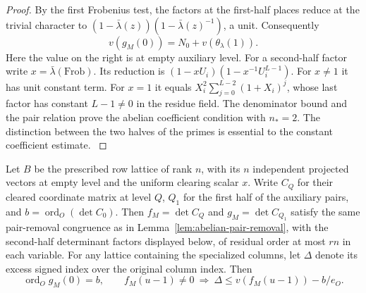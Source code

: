 \begin{proof}
By the first Frobenius test, the factors at the first-half
places reduce at the trivial character to
\((1-\bar\lambda(z))(1-\bar\lambda(z)^{-1})\), a unit.
Consequently
\[
 v(g_M(0))=N_0+v(\theta_\lambda(1)).
\]
Here the value on the right is at empty auxiliary level.
For a second-half factor write \(x=\bar\lambda(\mathrm{Frob})\).
Its reduction is \((1-xU_i)(1-x^{-1}U_i^{L-1})\).
For \(x\ne1\) it has unit constant term. For \(x=1\)
it equals \(X_i^2\sum_{j=0}^{L-2}(1+X_i)^j\), whose last
factor has constant \(L-1\ne0\) in the residue field.
The denominator bound and the pair relation prove the abelian coefficient condition with \(n_*=2\). The distinction between the
two halves of the primes is essential to the constant
coefficient estimate. \label{cor:twist-euler-1}
\end{proof}

\begin{proposition}\label{prop:row-pair-removal}
Let \(B\) be the prescribed row lattice of rank \(n\), with its
\(n\) independent projected vectors at empty level and the uniform
clearing scalar \(x\). Write \(C_Q\) for their cleared coordinate
matrix at level \(Q\), \(Q_1\) for the first half of the auxiliary
pairs, and \(b=\operatorname{ord}_O(\det C_0)\). Then
\(f_M=\det C_Q\) and \(g_M=\det C_{Q_1}\) satisfy the same
pair-removal congruence as in Lemma~\ref{lem:abelian-pair-removal},
with the second-half determinant factors displayed below, of residual
order at most \(rn\) in each variable. For any lattice containing the specialized columns, let \(\Delta\) denote its excess signed index over the original column index. Then
\[
 \operatorname{ord}_O g_M(0)=b,\qquad f_M(u-1)\ne0\ \Longrightarrow\ \Delta\le v(f_M(u-1))-b/e_O.
\]
\end{proposition}

